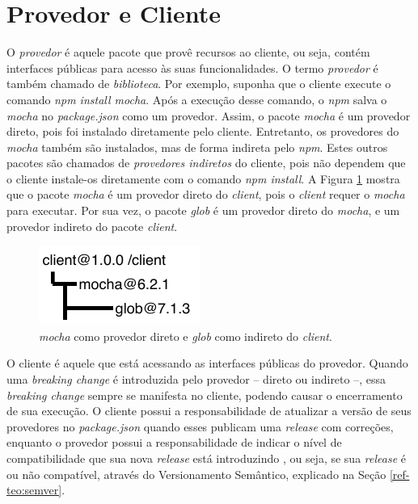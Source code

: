 \section{Provedor e Cliente}
\label{ref-teo:prov_clie}
O \textit{provedor} é aquele pacote que provê recursos ao cliente, ou seja, contém interfaces públicas para acesso às suas funcionalidades. O termo \textit{provedor} é também chamado de \textit{biblioteca}. Por exemplo, suponha que o cliente execute o comando \textit{npm install mocha}. Após a execução desse comando, o \textit{npm} salva o \textit{mocha} no \textit{package.json} como um provedor. Assim, o pacote \textit{mocha} é um provedor direto, pois foi instalado diretamente pelo cliente. Entretanto, os provedores do \textit{mocha} também são instalados, mas de forma indireta pelo \textit{npm}. Estes outros pacotes são chamados de \textit{provedores indiretos} do cliente, pois não dependem que o cliente instale-os diretamente com o comando \textit{npm install}. A Figura \ref{fig:provider} mostra que o pacote \textit{mocha} é um provedor direto do \textit{client}, pois o \textit{client} requer o \textit{mocha} para executar. Por sua vez, o pacote \textit{glob} é um provedor direto do \textit{mocha}, e um provedor indireto do pacote \textit{client}.

\begin{figure}
    \centering
    \includegraphics[scale=1.4]{figuras/provider_directly_undirectly.pdf}
    \caption{\textit{mocha} como provedor direto e \textit{glob} como indireto do \textit{client}.}
    \label{fig:provider}
\end{figure}{}

O cliente é aquele que está acessando as interfaces públicas do provedor. Quando uma \textit{breaking change} é introduzida pelo provedor -- direto ou indireto --, essa \textit{breaking change} sempre se manifesta no cliente, podendo causar o encerramento de sua execução. O cliente possui a responsabilidade de atualizar a versão de seus provedores no \textit{package.json} quando esses publicam uma \textit{release} com correções, enquanto o provedor possui a responsabilidade de indicar o nível de compatibilidade que sua nova \textit{release} está introduzindo \cite{teorical_reference:semver}, ou seja, se sua \textit{release} é ou não compatível, através do Versionamento Semântico, explicado na Seção \ref{ref-teo:semver}.

